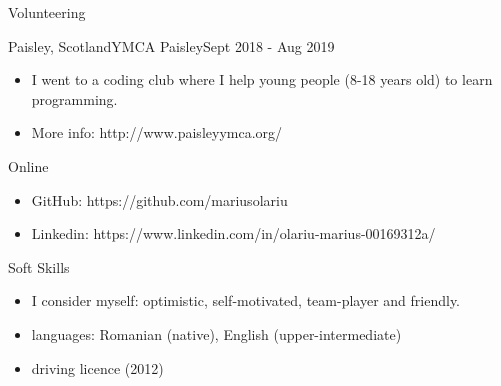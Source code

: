 \documentclass[]{mcdowellcv}
\begin{document}
	\begin{cvsection}{Volunteering}
		\begin{cvsubsection}{Paisley, Scotland}{YMCA Paisley}{Sept 2018 - Aug 2019}
			\begin{itemize}
				\item I went to a coding club where I help young people (8-18 years old) to learn programming. 
				\item More info: http://www.paisleyymca.org/
			\end{itemize}
		\end{cvsubsection}
	\end{cvsection}

	\begin{cvsection}{Online}
		\begin{cvsubsection}{}{}{}
			\begin{itemize}
				\item GitHub: https://github.com/mariusolariu
				\item Linkedin: https://www.linkedin.com/in/olariu-marius-00169312a/
			\end{itemize}
		\end{cvsubsection}
	\end{cvsection}

	\begin{cvsection}{Soft Skills}
		\begin{cvsubsection}{}{}{}
			\begin{itemize}
				\item I consider myself: optimistic, self-motivated, team-player and friendly.
				\item languages: Romanian (native), English (upper-intermediate)
				\item driving licence (2012)
			\end{itemize}
		\end{cvsubsection}
	\end{cvsection}
	
\end{document}
